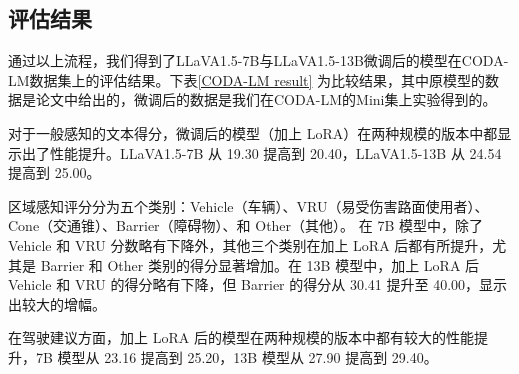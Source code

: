 \documentclass[
    linespread = 1.25
]{ctexart}
\begin{document}
\subsection{评估结果}
通过以上流程，我们得到了LLaVA1.5-7B与LLaVA1.5-13B微调后的模型在CODA-LM数据集上的评估结果。下表\ref{CODA-LM result}
为比较结果，其中原模型的数据是论文\cite{chen2024automatedevaluationlargevisionlanguage}中给出的，微调后的数据是我们在CODA-LM的Mini集上实验得到的。

对于一般感知的文本得分，微调后的模型（加上 LoRA）在两种规模的版本中都显示出了性能提升。LLaVA1.5-7B 从 19.30 提高到 20.40，LLaVA1.5-13B 从 24.54 提高到 25.00。

区域感知评分分为五个类别：Vehicle（车辆）、VRU（易受伤害路面使用者）、Cone（交通锥）、Barrier（障碍物）、和 Other（其他）。
在 7B 模型中，除了 Vehicle 和 VRU 分数略有下降外，其他三个类别在加上 LoRA 后都有所提升，尤其是 Barrier 和 Other 类别的得分显著增加。在 13B 模型中，加上 LoRA 后 Vehicle 和 VRU 的得分略有下降，但 Barrier 的得分从 30.41 提升至 40.00，显示出较大的增幅。

在驾驶建议方面，加上 LoRA 后的模型在两种规模的版本中都有较大的性能提升，7B 模型从 23.16 提高到 25.20，13B 模型从 27.90 提高到 29.40。
\end{document}
